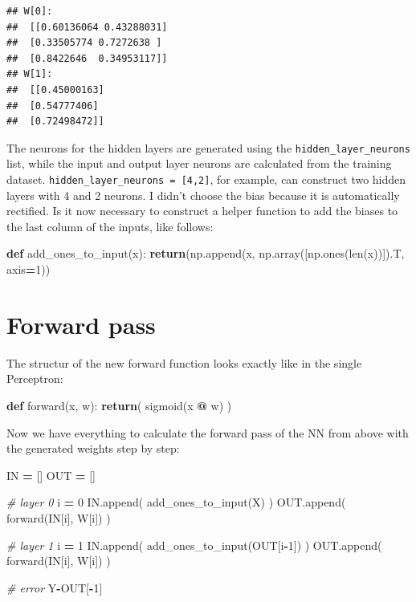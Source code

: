 \documentclass[
]{book}
\newenvironment{Shaded}{\begin{snugshade}}{\end{snugshade}}
\newcommand{\BuiltInTok}[1]{#1}
\newcommand{\CommentTok}[1]{\textcolor[rgb]{0.56,0.35,0.01}{\textit{#1}}}
\newcommand{\ControlFlowTok}[1]{\textcolor[rgb]{0.13,0.29,0.53}{\textbf{#1}}}
\newcommand{\DecValTok}[1]{\textcolor[rgb]{0.00,0.00,0.81}{#1}}
\newcommand{\KeywordTok}[1]{\textcolor[rgb]{0.13,0.29,0.53}{\textbf{#1}}}
\newcommand{\NormalTok}[1]{#1}
\newcommand{\OperatorTok}[1]{\textcolor[rgb]{0.81,0.36,0.00}{\textbf{#1}}}
\begin{document}
\begin{verbatim}
## W[0]: 
##  [[0.60136064 0.43288031]
##  [0.33505774 0.7272638 ]
##  [0.8422646  0.34953117]]
## W[1]: 
##  [[0.45000163]
##  [0.54777406]
##  [0.72498472]]
\end{verbatim}

The neurons for the hidden layers are generated using the \texttt{hidden\_layer\_neurons} list, while the input and output layer neurons are calculated from the training dataset. \texttt{hidden\_layer\_neurons\ =\ {[}4,2{]}}, for example, can construct two hidden layers with 4 and 2 neurons. I didn't choose the bias because it is automatically rectified.
Is it now necessary to construct a helper function to add the biases to the last column of the inputs, like follows:

\begin{Shaded}
\begin{Highlighting}[]
\KeywordTok{def}\NormalTok{ add\_ones\_to\_input(x):}
  \ControlFlowTok{return}\NormalTok{(np.append(x, np.array([np.ones(}\BuiltInTok{len}\NormalTok{(x))]).T, axis}\OperatorTok{=}\DecValTok{1}\NormalTok{))}
\end{Highlighting}
\end{Shaded}

\hypertarget{forward-pass-1}{%
\section{Forward pass}\label{forward-pass-1}}

The structur of the new forward function looks exactly like in the single Perceptron:

\begin{Shaded}
\begin{Highlighting}[]
\KeywordTok{def}\NormalTok{ forward(x, w):}
  \ControlFlowTok{return}\NormalTok{( sigmoid(x }\OperatorTok{@}\NormalTok{ w) )}
\end{Highlighting}
\end{Shaded}

Now we have everything to calculate the forward pass of the NN from above with the generated weights step by step:

\begin{Shaded}
\begin{Highlighting}[]
\NormalTok{IN }\OperatorTok{=}\NormalTok{ []}
\NormalTok{OUT }\OperatorTok{=}\NormalTok{ []}

\CommentTok{\# layer 0}
\NormalTok{i }\OperatorTok{=} \DecValTok{0}
\NormalTok{IN.append( add\_ones\_to\_input(X) )}
\NormalTok{OUT.append( forward(IN[i], W[i]) )}

\CommentTok{\# layer 1}
\NormalTok{i }\OperatorTok{=} \DecValTok{1}
\NormalTok{IN.append( add\_ones\_to\_input(OUT[i}\OperatorTok{{-}}\DecValTok{1}\NormalTok{]) )}
\NormalTok{OUT.append( forward(IN[i], W[i]) )}

\CommentTok{\# error}
\NormalTok{Y}\OperatorTok{{-}}\NormalTok{OUT[}\OperatorTok{{-}}\DecValTok{1}\NormalTok{]}
\end{Highlighting}
\end{Shaded}
\end{document}
